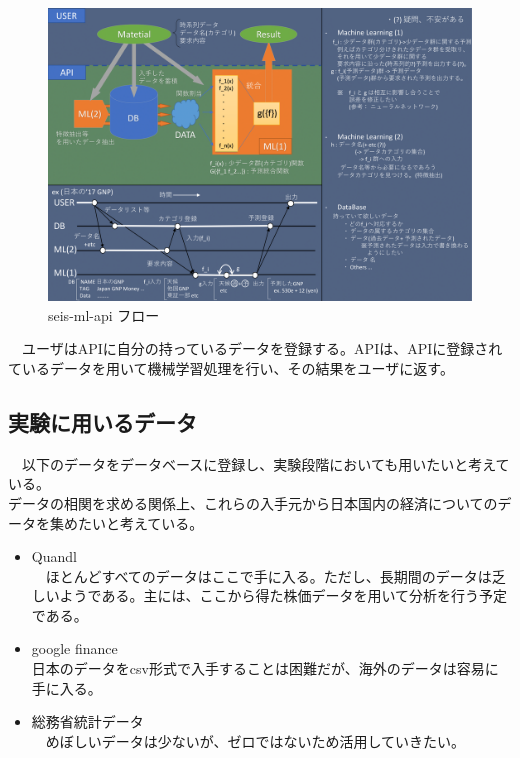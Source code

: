 \documentclass{scrartcl}
\begin{document}
\begin{table}[htbp]
\begin{figure}[htbp]
\centering
\includegraphics[width=15cm]{./idea-0-1.png}
\caption{seis-ml-api フロー}
\end{figure}

　ユーザはAPIに自分の持っているデータを登録する。APIは、APIに登録されているデータを用いて機械学習処理を行い、その結果をユーザに返す。\\

\subsection{実験に用いるデータ}
\label{sec:org3a61408}
　以下のデータをデータベースに登録し、実験段階においても用いたいと考えている。\\
   データの相関を求める関係上、これらの入手元から日本国内の経済についてのデータを集めたいと考えている。\\

\begin{itemize}
\item Quandl\\
　ほとんどすべてのデータはここで手に入る。ただし、長期間のデータは乏しいようである。主には、ここから得た株価データを用いて分析を行う予定である。\\
\item google finance\\
日本のデータをcsv形式で入手することは困難だが、海外のデータは容易に手に入る。\\
\item 総務省統計データ\\
　めぼしいデータは少ないが、ゼロではないため活用していきたい。\\
\end{itemize}


\end{table}
\end{document}
